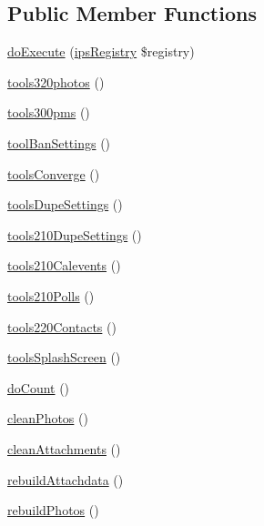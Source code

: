 \subsection*{Public Member Functions}
\begin{DoxyCompactItemize}
\item 
\hyperlink{classadmin__core__tools__rebuild_afbc4e912a0604b94d47d66744c64d8ba}{do\-Execute} (\hyperlink{classips_registry}{ips\-Registry} \$registry)
\item 
\hyperlink{classadmin__core__tools__rebuild_a01da90c60736ae3756616cb3e5ab7d73}{tools320photos} ()
\item 
\hyperlink{classadmin__core__tools__rebuild_ac56824d2f5509062f2938d9c33daffda}{tools300pms} ()
\item 
\hyperlink{classadmin__core__tools__rebuild_a5e288926de7fa61345bb1fb424841979}{tool\-Ban\-Settings} ()
\item 
\hyperlink{classadmin__core__tools__rebuild_a359951eecbff7cbb05915263c2429fd4}{tools\-Converge} ()
\item 
\hyperlink{classadmin__core__tools__rebuild_a66dce103169aeb448ef4f0e7f98a9bd1}{tools\-Dupe\-Settings} ()
\item 
\hyperlink{classadmin__core__tools__rebuild_a4bc3a5372a14c25660b5ec035aa2c5ef}{tools210\-Dupe\-Settings} ()
\item 
\hyperlink{classadmin__core__tools__rebuild_a8887484818e8239167b595379a1ca98e}{tools210\-Calevents} ()
\item 
\hyperlink{classadmin__core__tools__rebuild_aac8e1f6ee68083b0005c9131dd1562df}{tools210\-Polls} ()
\item 
\hyperlink{classadmin__core__tools__rebuild_a52b613e76c6d8ba707bfbd58674b5b98}{tools220\-Contacts} ()
\item 
\hyperlink{classadmin__core__tools__rebuild_a21018a1243461be1f2dd233419b34bad}{tools\-Splash\-Screen} ()
\item 
\hyperlink{classadmin__core__tools__rebuild_af75a5d4dea4f9d6771c0089cdee386f3}{do\-Count} ()
\item 
\hyperlink{classadmin__core__tools__rebuild_a8935923eac10bf65c1d0689ea7509b05}{clean\-Photos} ()
\item 
\hyperlink{classadmin__core__tools__rebuild_a49b12b15a439b23afd8d5f0c4a78660c}{clean\-Attachments} ()
\item 
\hyperlink{classadmin__core__tools__rebuild_af13250c64575389425dd825cdec48ed1}{rebuild\-Attachdata} ()
\item 
\hyperlink{classadmin__core__tools__rebuild_a2c9a4e6ace6e1087e8fb8cf262c4905d}{rebuild\-Photos} ()

\end{DoxyCompactItemize}

